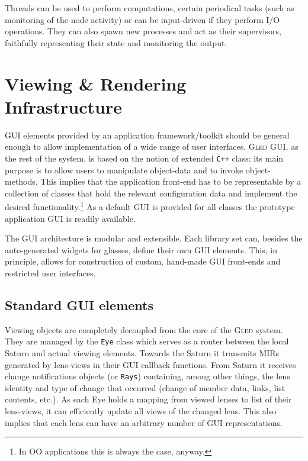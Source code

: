 \documentclass[a4paper,11pt]{article}
\def\gled{\textsc{Gled}\xspace}
\def\smalltt#1{{\small\texttt{#1}}}
\begin{document}
Threads can be used to perform computations, certain periodical tasks
(such as monitoring of the node activity) or can be input-driven if
they perform I/O operations. They can also spawn new processes and act
as their supervisors, faithfully representing their state and
monitoring the output.


\section{Viewing \& Rendering Infrastructure}

GUI elements provided by an application framework/toolkit should be
general enough to allow implementation of a wide range of user
interfaces.  \gled GUI, as the rest of the system, is based on the
notion of extended \smalltt{C++} class: its main purpose is to allow
users to manipulate object-data and to invoke object-methods. This
implies that the application front-end has to be representable by a
collection of classes that hold the relevant configuration data and
implement the desired functionality.\footnote{In OO applications this
  is always the case, anyway.}  As a default GUI is provided for all
classes the prototype application GUI is readily available.

The GUI architecture is modular and extensible. Each library set can,
besides the auto-generated widgets for glasses, define their own GUI
elements. This, in principle, allows for construction of custom,
hand-made GUI front-ends and restricted user interfaces.

\subsection{Standard GUI elements}

Viewing objects are completely decoupled from the core of the \gled
system. They are managed by the \smalltt{Eye} class which serves as a
router between the local Saturn and actual viewing elements. Towards
the Saturn it transmits MIRs generated by lens-views in their GUI
callback functions. From Saturn it receives change notifications
objects (or \smalltt{Rays}) containing, among other things, the lens
identity and type of change that occurred (change of member data, links,
list contents, etc.). As each Eye holds a mapping from viewed
lenses to list of their lens-views, it can efficiently update all
views of the changed lens. This also implies that each lens can have
an arbitrary number of GUI representations.
\end{document}
